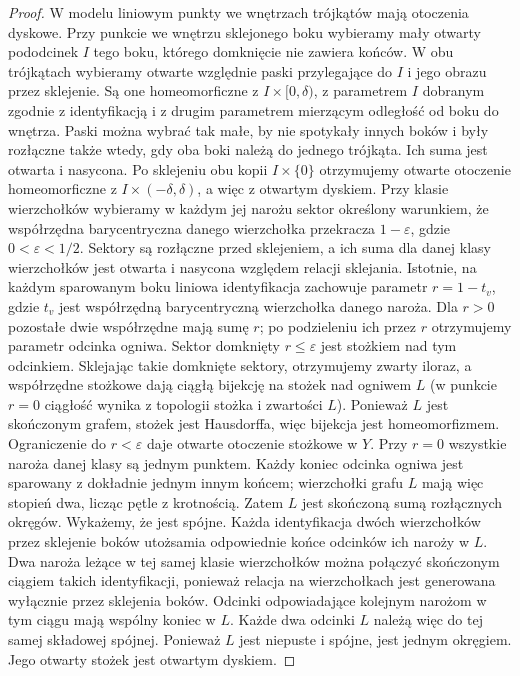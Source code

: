 \begin{proof}
W modelu liniowym punkty we wnętrzach trójkątów
mają otoczenia dyskowe. Przy punkcie we wnętrzu
sklejonego boku wybieramy mały otwarty pododcinek
$I$ tego boku, którego domknięcie nie zawiera końców.
W obu trójkątach wybieramy otwarte względnie
paski przylegające do $I$ i jego obrazu przez
sklejenie. Są one homeomorficzne z
$I\times[0,\delta)$, z parametrem $I$ dobranym
zgodnie z identyfikacją i z drugim parametrem
mierzącym odległość od boku do wnętrza.
Paski można wybrać tak małe, by nie spotykały
innych boków i były rozłączne także wtedy,
gdy oba boki należą do jednego trójkąta.
Ich suma jest otwarta i nasycona. Po sklejeniu
obu kopii $I\times\{0\}$ otrzymujemy otwarte
otoczenie homeomorficzne z
$I\times(-\delta,\delta)$, a więc z otwartym
dyskiem.
Przy klasie wierzchołków wybieramy w każdym jej
narożu sektor określony warunkiem, że współrzędna
barycentryczna danego wierzchołka przekracza
$1-\varepsilon$, gdzie $0<\varepsilon<1/2$.
Sektory są rozłączne przed sklejeniem, a ich suma
dla danej klasy wierzchołków jest otwarta i
nasycona względem relacji sklejania. Istotnie,
na każdym sparowanym boku liniowa identyfikacja
zachowuje parametr $r=1-t_v$, gdzie $t_v$ jest
współrzędną barycentryczną wierzchołka danego naroża.
Dla $r>0$ pozostałe dwie współrzędne mają sumę $r$;
po podzieleniu ich przez $r$ otrzymujemy parametr
odcinka ogniwa. Sektor domknięty $r\le\varepsilon$
jest stożkiem nad tym odcinkiem. Sklejając takie
domknięte sektory, otrzymujemy zwarty iloraz,
a współrzędne stożkowe dają ciągłą bijekcję na
stożek nad ogniwem $L$ (w punkcie $r=0$ ciągłość
wynika z topologii stożka i zwartości $L$).
Ponieważ $L$ jest skończonym grafem, stożek jest
Hausdorffa, więc bijekcja jest homeomorfizmem.
Ograniczenie do $r<\varepsilon$ daje otwarte
otoczenie stożkowe w $Y$.
Przy $r=0$ wszystkie naroża danej klasy są jednym
punktem. Każdy koniec odcinka ogniwa
jest sparowany z dokładnie jednym innym końcem;
wierzchołki grafu $L$ mają więc stopień dwa,
licząc pętle z krotnością. Zatem $L$ jest skończoną
sumą rozłącznych okręgów. Wykażemy, że jest spójne.
Każda identyfikacja dwóch wierzchołków przez
sklejenie boków utożsamia odpowiednie końce
odcinków ich naroży w $L$. Dwa naroża leżące
w tej samej klasie wierzchołków można połączyć
skończonym ciągiem takich identyfikacji, ponieważ
relacja na wierzchołkach jest generowana wyłącznie
przez sklejenia boków. Odcinki odpowiadające
kolejnym narożom w tym ciągu mają wspólny koniec
w $L$. Każde dwa odcinki $L$ należą więc do tej
samej składowej spójnej. Ponieważ $L$ jest
niepuste i spójne, jest jednym okręgiem.
Jego otwarty stożek jest otwartym dyskiem.


\end{proof}
